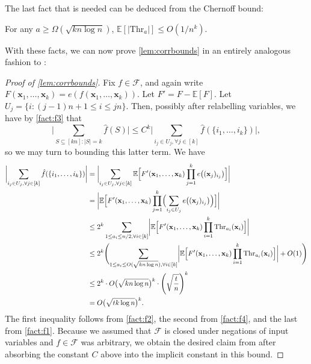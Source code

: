 The last fact that is needed can be deduced from the Chernoff bound:
\begin{fact}
\label{fact:f4}
For any $a\geq \Omega(\sqrt{kn\log n})$, $\mathbb{E}[\vert \mathrm{Thr}_a\vert]\leq O(1/n^k)$.
\end{fact}

With these facts, we can now prove \cref{lem:corrbounds} in an entirely analogous fashion to \cite{xorlemma}:

\begin{proof}[Proof of \cref{lem:corrbounds}]
Fix $f\in \mathcal{F}$, and again write $F(\mathbf{x}_1,\ldots,\mathbf{x}_k)=e(f(\mathbf{x}_1,\ldots,\mathbf{x}_k))$. Let $F'= F-\mathbb{E}[F]$. 
Let $U_j = \{ i :  (j-1)n+1\leq i\leq jn \}$.
Then, possibly after relabelling variables, we have by \cref{fact:f3} that
\[
    \biggl| \sum_{S\subseteq [kn]:\vert S\vert=k} \hat{f}(S)\biggr|
    \leq C^k \biggl| \sum_{ i_j \in U_j , \forall j\in [k]} \hat{f}(\{i_1,\ldots,i_k\})\biggr|,
\]
so we may turn to bounding this latter term. We have
\begin{align*}
    \biggl| \sum_{ i_j \in U_j , \forall j\in [k]} \hat{f}(\{i_1,\ldots,i_k\}) \biggr|
    &= \biggl| \sum_{ i_j \in U_j, \forall j\in [k]} \mathbb{E}\Bigl[F'(\mathbf{x}_1,\ldots,\mathbf{x}_k)\prod_{j=1}^k e\bigl((\mathbf{x}_j)_{i_j}\bigr)\Bigr]\biggr|\\
    &=\biggl| \mathbb{E}\Bigl[F'(\mathbf{x}_1,\ldots,\mathbf{x}_k)\prod_{j=1}^k \Bigl(\sum_{ i_j \in U_j }e\bigl((\mathbf{x}_j)_{i_j}\bigr)\Bigr)\Bigr]\biggr|\\
    &\leq 2^k \sum_{1\leq a_i\leq n/2, \forall i\in [k]} \biggl| \mathbb{E}\Bigl[F'(\mathbf{x}_1,\ldots,\mathbf{x}_k)\prod_{i=1}^k \mathrm{Thr}_{a_i}(\mathbf{x}_i)\Bigr]\biggr|\\
    &\leq 2^k\Biggl(\sum_{1\leq a_i\leq O(\sqrt{kn\log n}), \forall i\in [k]} \biggl| \mathbb{E}\Bigl[F'(\mathbf{x}_1,\ldots,\mathbf{x}_k)\prod_{i=1}^k \mathrm{Thr}_{a_i}(\mathbf{x}_i)\Bigr]\biggr| + O(1)\Biggr)\\
    &\leq 2^k\cdot O\bigl(\sqrt{kn\log n} \bigr)^k\cdot \left(\sqrt{\frac{t}{n}}\right)^k\\
    &= O \bigl(\sqrt{tk\log n} \bigr)^k.
\end{align*}
The first inequality follows from \cref{fact:f2}, the second from \cref{fact:f4}, and the last from \cref{fact:f1}. Because we assumed that $\mathcal{F}$ is closed under negations of input variables and $f\in \mathcal{F}$ was arbitrary, we obtain the desired claim from  after absorbing the constant $C$ above into the implicit constant in this bound.
\end{proof}


